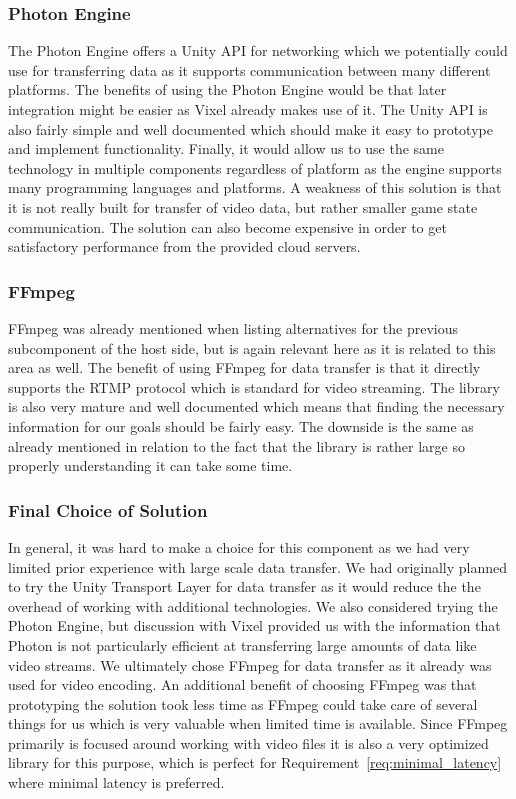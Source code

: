 \subsubsection{Photon Engine}
The Photon Engine\cite{photon_homepage} offers a Unity API for networking which we potentially could use for transferring data as it supports communication between many different platforms. The benefits of using the Photon Engine would be that later integration might be easier as Vixel already makes use of it. The Unity API is also fairly simple and well documented which should make it easy to prototype and implement functionality. Finally, it would allow us to use the same technology in multiple components regardless of platform as the engine supports many programming languages and platforms. A weakness of this solution is that it is not really built for transfer of video data, but rather smaller game state communication. The solution can also become expensive in order to get satisfactory performance from the provided cloud servers. 

\subsubsection{FFmpeg}
FFmpeg was already mentioned when listing alternatives for the previous subcomponent of the host side, but is again relevant here as it is related to this area as well. The benefit of using FFmpeg for data transfer is that it directly supports the RTMP protocol which is standard for video streaming. The library is also very mature and well documented which means that finding the necessary information for our goals should be fairly easy. The downside is the same as already mentioned in relation to the fact that the library is rather large so properly understanding it can take some time. 

\subsubsection{Final Choice of Solution}
In general, it was hard to make a choice for this component as we had very limited prior experience with large scale data transfer. We had originally planned to try the Unity Transport Layer for data transfer as it would reduce the the overhead of working with additional technologies. We also considered trying the Photon Engine, but discussion with Vixel provided us with the information that Photon is not particularly efficient at transferring large amounts of data like video streams. We ultimately chose FFmpeg for data transfer as it already was used for video encoding. An additional benefit of choosing FFmpeg was that prototyping the solution took less time as FFmpeg could take care of several things for us which is very valuable when limited time is available. Since FFmpeg primarily is focused around working with video files it is also a very optimized library for this purpose, which is perfect for Requirement~\ref{req:minimal_latency} where minimal latency is preferred. 

